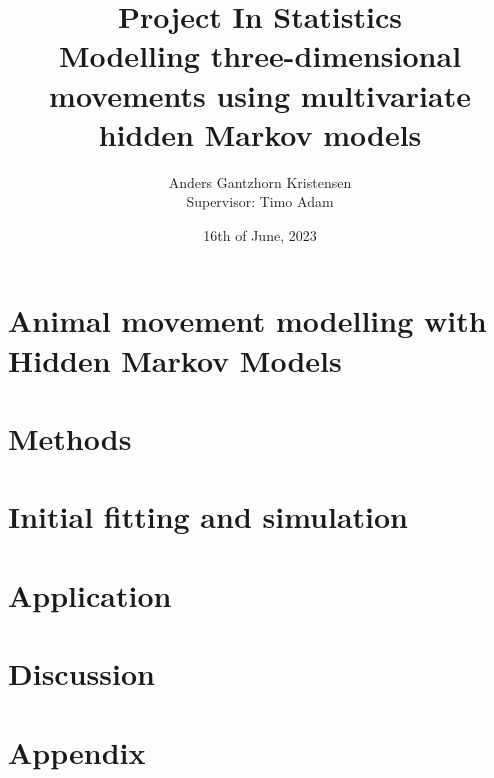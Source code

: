 \documentclass[11pt]{article}
\begin{document}
\pagestyle{fancy}
\fancyfoot{}
\fancyfoot[C]{\thepage}
\renewcommand{\headrulewidth}{0pt}
\renewcommand{\footrulewidth}{0pt}
\allowdisplaybreaks



\title{\vspace{-4cm}Project In Statistics\\
Modelling three-dimensional movements using
multivariate hidden Markov models}
\author{Anders Gantzhorn Kristensen\\
Supervisor: Timo Adam}
\date{16th of June, 2023}
\maketitle
\section{Animal movement modelling with Hidden Markov Models}

\section{Methods}

\newpage
\section{Initial fitting and simulation}

\section{Application}

\section{Discussion}


\newpage
\appendix
\section*{Appendix}

\end{document}
